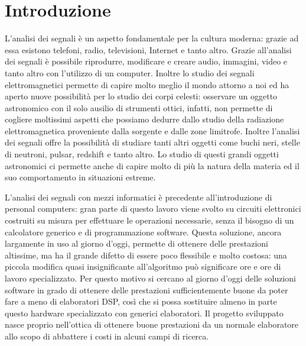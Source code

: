 \chapter*{Introduzione}
\label{intro}

L'analisi dei segnali \`e un aspetto fondamentale per la cultura moderna: grazie
ad essa esistono telefoni, radio, televisioni, Internet e tanto altro. Grazie
all'analisi dei segnali \`e possibile riprodurre, modificare e creare audio,
immagini, video e tanto altro con l'utilizzo di un computer. Inoltre lo studio
dei segnali elettromagnetici permette di capire molto meglio il mondo attorno a
noi ed ha aperto nuove possibilit\`a per lo studio dei corpi celesti: osservare
un oggetto astronomico con il solo ausilio di strumenti ottici, infatti, non
permette di cogliere moltissimi aspetti che possiamo dedurre dallo studio della
radiazione elettromagnetica proveniente dalla sorgente e dalle zone limitrofe.
Inoltre l'analisi dei segnali offre la possibilit\`a di studiare tanti altri
oggetti come buchi neri, stelle di neutroni, pulsar, redshift e tanto altro. Lo
studio di questi grandi oggetti astronomici ci permette anche di capire molto di
pi\`u la natura della materia ed il suo comportamento in situazioni estreme.

L'analisi dei segnali con mezzi informatici \`e precedente all'introduzione di
personal computers: gran parte di questo lavoro viene svolto su circuiti
elettronici costruiti su misura per effettuare le operazioni necessarie, senza
il bisogno di un calcolatore generico e di programmazione software. Questa
soluzione, ancora largamente in uso al giorno d'oggi, permette di ottenere delle
prestazioni altissime, ma ha il grande difetto di essere poco flessibile e molto
costosa: una piccola modifica quasi insignificante all'algoritmo pu\`o
significare ore e ore di lavoro specializzato. Per questo motivo si cercano al
giorno d'oggi delle soluzioni software in grado di ottenere delle prestazioni
sufficientemente buone da poter fare a meno di elaboratori DSP, cos\`i che si
possa sostituire almeno in parte questo hardware specializzato con generici
elaboratori. Il progetto sviluppato nasce proprio nell'ottica di ottenere buone
prestazioni da un normale elaboratore allo scopo di abbattere i costi in alcuni
campi di ricerca.
